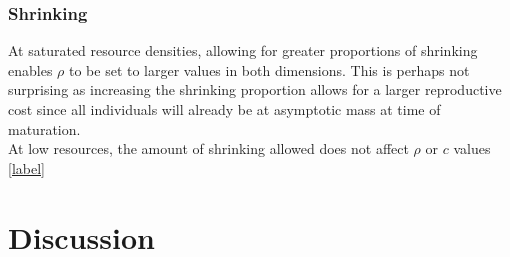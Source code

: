 \documentclass[a4paper, 11pt, hidelinks]{article} %
\begin{document}
	\subsubsection{Shrinking}
	At saturated resource densities, allowing for greater proportions of shrinking enables $\rho$ to be set to larger values in both dimensions.  This is perhaps not surprising as increasing the shrinking proportion allows for a larger reproductive cost since all individuals will already be at asymptotic mass at time of maturation.
	\\
	At low resources, the amount of shrinking allowed does not affect $ \rho $ or $ c $ values \ref{label}

			



	\nolinenumbers
	
\section{Discussion}
	\linenumbers
	
	
	
\end{document}
